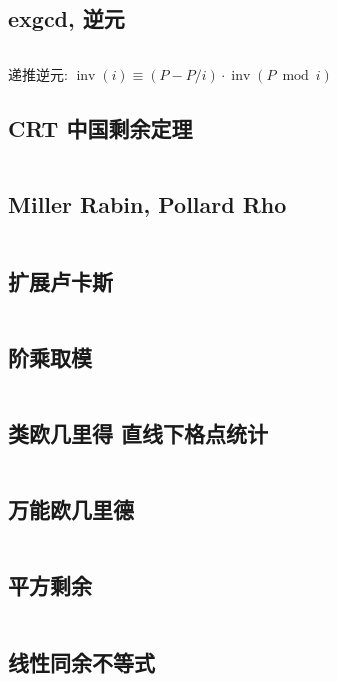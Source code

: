 \documentclass[titlepage, a4paper, 11pt]{article}
\begin{document}
\begin{spacing}{1.15}
				\subsection{exgcd, 逆元}
					
					\inputminted{cpp}{src/Math/exgcd.cpp}
					递推逆元: $\operatorname{inv}(i) \equiv (P - P / i) \cdot \operatorname{inv}(P \bmod i)$
				\subsection{CRT 中国剩余定理}
					\inputminted{cpp}{src/Math/CRT_lbn.cpp}
				\subsection{Miller Rabin, Pollard Rho}
					\inputminted{cpp}{src/Math/Miller Rabin And Pollard Rho.cpp}
				\subsection{扩展卢卡斯}
					\inputminted{cpp}{src/Math/扩展卢卡斯.cpp}
				\subsection{阶乘取模}
					\inputminted{cpp}{src/Math/Factorial Mod.cpp}
				\subsection{类欧几里得 直线下格点统计}
					\inputminted{cpp}{src/Math/直线下格点统计.cpp}
				\subsection{万能欧几里德}
					\inputminted{cpp}{src/zjj/euclid.cpp}
				\subsection{平方剩余}
					\inputminted{cpp}{src/Math/平方剩余.cpp}
				\subsection{线性同余不等式}
					\inputminted{cpp}{src/Math/线性同余不等式.cpp}

\end{spacing}
\end{document}
